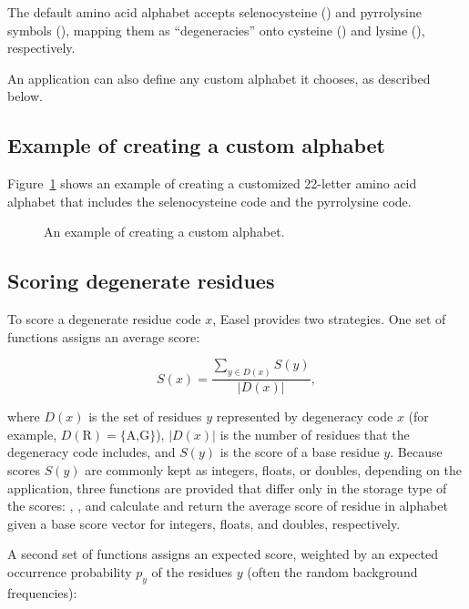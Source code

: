 The default amino acid alphabet accepts selenocysteine () and
pyrrolysine symbols (), mapping them as ``degeneracies'' onto
cysteine () and lysine (), respectively.

An application can also define any custom alphabet it chooses, as
described below.


\subsection{Example of creating a custom alphabet}

Figure~\ref{fig:alphabet_example2} shows an example of creating a
customized 22-letter amino acid alphabet that includes the 
selenocysteine code and the  pyrrolysine code.

\begin{figure}

\caption{An example of creating a custom alphabet.}
\label{fig:alphabet_example2}
\end{figure}



\subsection{Scoring degenerate residues}

To score a degenerate residue code $x$, Easel provides two strategies.
One set of functions assigns an average score:

\[
  S(x) =  \frac{\sum_{y \in D(x)}  S(y) } { |D(x)| },
\]

where $D(x)$ is the set of residues $y$ represented by degeneracy code
$x$ (for example, $D(\mbox{R}) = \{ \mbox{A,G} \}$), $| D(x) |$ is the
number of residues that the degeneracy code includes, and $S(y)$ is
the score of a base residue $y$. Because scores $S(y)$ are commonly
kept as integers, floats, or doubles, depending on the application,
three functions are provided that differ only in the storage type of
the scores: ,
, and
 calculate and return the average
score of residue  in alphabet  given a base score
vector  for integers, floats, and doubles,
respectively.

A second set of functions assigns an expected score, weighted by an
expected occurrence probability $p_y$ of the residues $y$ (often the
random background frequencies):

